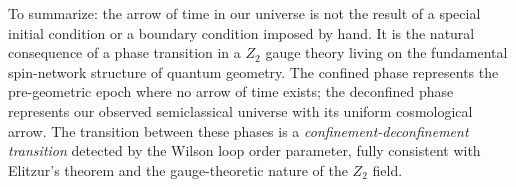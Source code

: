 To summarize: the arrow of time in our universe is not the result of a special initial condition or a boundary condition imposed by hand. It is the natural consequence of a phase transition in a $ Z_2 $ gauge theory living on the fundamental spin-network structure of quantum geometry. The confined phase represents the pre-geometric epoch where no arrow of time exists; the deconfined phase represents our observed semiclassical universe with its uniform cosmological arrow. The transition between these phases is a \emph{confinement-deconfinement transition} detected by the Wilson loop order parameter, fully consistent with Elitzur's theorem and the gauge-theoretic nature of the $ Z_2 $ field.

